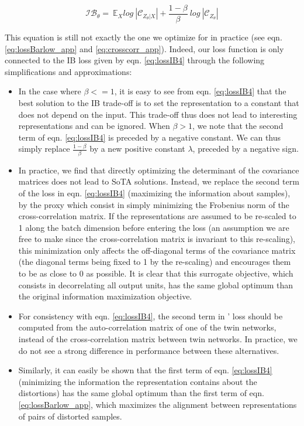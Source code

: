 \begin{equation}
   \mathcal{IB_{ \theta}} =  ~\mathbb{E}_{X} log ~|\mathcal{C}_{Z_\theta|X}| + \frac{1-\beta}{\beta} ~log ~|\mathcal{C}_{Z_\theta}|
    \label{eq:lossIB4}
\end{equation}

This equation is still not exactly the one we optimize for in practice (see eqn. \ref{eq:lossBarlow_app} and \ref{eq:crosscorr_app}). Indeed, our loss function is only connected to the IB loss given by eqn. \ref{eq:lossIB4} through the following simplifications and approximations:
\begin{itemize}
  \item In the case where $\beta<=1$, it is easy to see from eqn. \ref{eq:lossIB4} that the best solution to the IB trade-off is to set the representation to a constant that does not depend on the input. This trade-off thus does not lead to interesting representations and can be ignored. When $\beta>1$, we note that the second term of eqn. \ref{eq:lossIB4} is preceded by a negative constant. We can thus simply replace $\frac{1-\beta}{\beta}$ by a new positive constant $\lambda$, preceded by a negative sign.
  
  \item In practice, we find that directly optimizing the determinant of the covariance matrices does not lead to SoTA solutions. Instead, we replace the second term of the loss in eqn. \ref{eq:lossIB4} (maximizing the information about samples), by the proxy which consist in simply minimizing the Frobenius norm of the cross-correlation matrix. If the representations are assumed to be re-scaled to 1 along the batch dimension before entering the loss (an assumption we are free to make since the cross-correlation matrix is invariant to this re-scaling), this minimization only affects the off-diagonal terms of the covariance matrix
  (the diagonal terms being fixed to 1 by the re-scaling) and encourages them to be as close to 0 as possible. It is clear that this surrogate objective, which consists in decorrelating all output units, has the same global optimum than the original information maximization objective. 
  
  \item For consistency with eqn. \ref{eq:lossIB4}, the second term in \AlgoName' loss should be computed from the auto-correlation matrix of one of the twin networks, instead of the cross-correlation matrix between twin networks. In practice, we do not see a strong difference in performance between these alternatives.
  
  \item Similarly, it can easily be shown that the first term of eqn. \ref{eq:lossIB4} (minimizing the information the representation contains about the distortions) has the same global optimum than the first term of eqn. \ref{eq:lossBarlow_app}, which maximizes the alignment between representations of pairs of distorted samples.  
\end{itemize}

